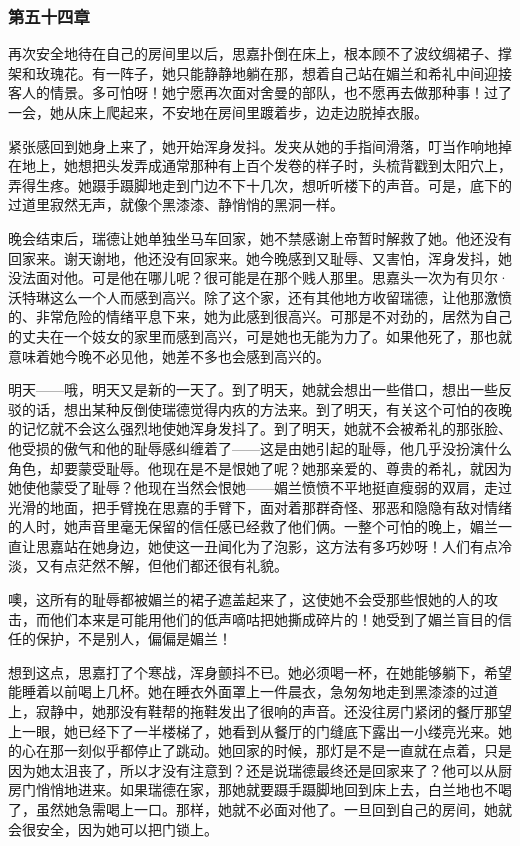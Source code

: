 \subsubsection{第五十四章}

\par 再次安全地待在自己的房间里以后，思嘉扑倒在床上，根本顾不了波纹绸裙子、撑架和玫瑰花。有一阵子，她只能静静地躺在那，想着自己站在媚兰和希礼中间迎接客人的情景。多可怕呀！她宁愿再次面对舍曼的部队，也不愿再去做那种事！过了一会，她从床上爬起来，不安地在房间里踱着步，边走边脱掉衣服。
\par 紧张感回到她身上来了，她开始浑身发抖。发夹从她的手指间滑落，叮当作响地掉在地上，她想把头发弄成通常那种有上百个发卷的样子时，头梳背戳到太阳穴上，弄得生疼。她蹑手蹑脚地走到门边不下十几次，想听听楼下的声音。可是，底下的过道里寂然无声，就像个黑漆漆、静悄悄的黑洞一样。
\par 晚会结束后，瑞德让她单独坐马车回家，她不禁感谢上帝暂时解救了她。他还没有回家来。谢天谢地，他还没有回家来。她今晚感到又耻辱、又害怕，浑身发抖，她没法面对他。可是他在哪儿呢？很可能是在那个贱人那里。思嘉头一次为有贝尔·沃特琳这么一个人而感到高兴。除了这个家，还有其他地方收留瑞德，让他那激愤的、非常危险的情绪平息下来，她为此感到很高兴。可那是不对劲的，居然为自己的丈夫在一个妓女的家里而感到高兴，可是她也无能为力了。如果他死了，那也就意味着她今晚不必见他，她差不多也会感到高兴的。
\par 明天——哦，明天又是新的一天了。到了明天，她就会想出一些借口，想出一些反驳的话，想出某种反倒使瑞德觉得内疚的方法来。到了明天，有关这个可怕的夜晚的记忆就不会这么强烈地使她浑身发抖了。到了明天，她就不会被希礼的那张脸、他受损的傲气和他的耻辱感纠缠着了——这是由她引起的耻辱，他几乎没扮演什么角色，却要蒙受耻辱。他现在是不是恨她了呢？她那亲爱的、尊贵的希礼，就因为她使他蒙受了耻辱？他现在当然会恨她——媚兰愤愤不平地挺直瘦弱的双肩，走过光滑的地面，把手臂挽在思嘉的手臂下，面对着那群奇怪、邪恶和隐隐有敌对情绪的人时，她声音里毫无保留的信任感已经救了他们俩。一整个可怕的晚上，媚兰一直让思嘉站在她身边，她使这一丑闻化为了泡影，这方法有多巧妙呀！人们有点冷淡，又有点茫然不解，但他们都还很有礼貌。
\par 噢，这所有的耻辱都被媚兰的裙子遮盖起来了，这使她不会受那些恨她的人的攻击，而他们本来是可能用他们的低声嘀咕把她撕成碎片的！她受到了媚兰盲目的信任的保护，不是别人，偏偏是媚兰！
\par 想到这点，思嘉打了个寒战，浑身颤抖不已。她必须喝一杯，在她能够躺下，希望能睡着以前喝上几杯。她在睡衣外面罩上一件晨衣，急匆匆地走到黑漆漆的过道上，寂静中，她那没有鞋帮的拖鞋发出了很响的声音。还没往房门紧闭的餐厅那望上一眼，她已经下了一半楼梯了，她看到从餐厅的门缝底下露出一小缕亮光来。她的心在那一刻似乎都停止了跳动。她回家的时候，那灯是不是一直就在点着，只是因为她太沮丧了，所以才没有注意到？还是说瑞德最终还是回家来了？他可以从厨房门悄悄地进来。如果瑞德在家，那她就要蹑手蹑脚地回到床上去，白兰地也不喝了，虽然她急需喝上一口。那样，她就不必面对他了。一旦回到自己的房间，她就会很安全，因为她可以把门锁上。
